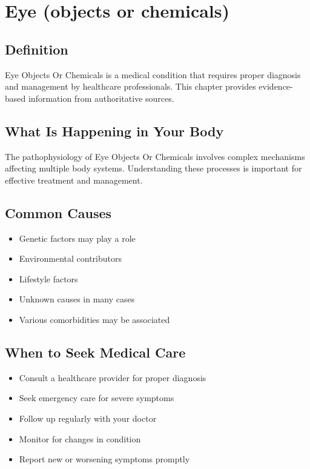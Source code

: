 
\chapter{Eye (objects or chemicals)}

\section*{Definition}
Eye Objects Or Chemicals is a medical condition that requires proper diagnosis and management by healthcare professionals. This chapter provides evidence-based information from authoritative sources.

\section*{What Is Happening in Your Body}
The pathophysiology of Eye Objects Or Chemicals involves complex mechanisms affecting multiple body systems. Understanding these processes is important for effective treatment and management.

\section*{Common Causes}
\begin{itemize}
  \item Genetic factors may play a role
  \item Environmental contributors
  \item Lifestyle factors
  \item Unknown causes in many cases
  \item Various comorbidities may be associated
\end{itemize}

\section*{When to Seek Medical Care}
\begin{itemize}
  \item Consult a healthcare provider for proper diagnosis
  \item Seek emergency care for severe symptoms
  \item Follow up regularly with your doctor
  \item Monitor for changes in condition
  \item Report new or worsening symptoms promptly
\end{itemize}

